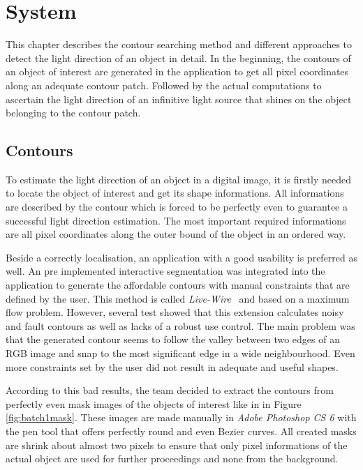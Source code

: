 \section{System}\label{sec:System}
This chapter describes the contour searching method and different approaches to detect the light direction of an object in detail. In the beginning, the contours of an object of interest are generated in the application to get all pixel coordinates along an adequate contour patch. Followed by the actual computations to ascertain the light direction of an infinitive light source that shines on the object belonging to the contour patch.

\subsection{Contours}\label{sec:contours}
To estimate the light direction of an object in a digital image, it is firstly needed to locate the object of interest and get its shape informations. All informations are described by the contour which is forced to be perfectly even to guarantee a successful light direction estimation. The most important required informations are all pixel coordinates along the outer bound of the object in an ordered way. 

Beside a correctly localisation, an application with a good usability is preferred as well. An pre implemented interactive segmentation \cite{website:LiveWire} was integrated into the application to generate the affordable contours with manual constraints that are defined by the user. This method is called \textit{Live-Wire}~\cite{BARRETT1997331} and based on a maximum flow problem. However, several test showed that this extension calculates noisy and fault contours as well as lacks of a robust use control. The main problem was that the generated contour seems to follow the valley between two edges of an RGB image and snap to the most significant edge in a wide neighbourhood. Even more constraints set by the user did not result in adequate and useful shapes. 

According to this bad results, the team decided to extract the contours from perfectly even mask images of the objects of interest like in in Figure \ref{fig:batch1mask}. These images are made manually in \textit{Adobe Photoshop CS 6} with the pen tool that offers perfectly round and even Bezier curves. All created masks are shrink about almost two pixels to ensure that only pixel informations of the actual object are used for further proceedings and none from the background. 

